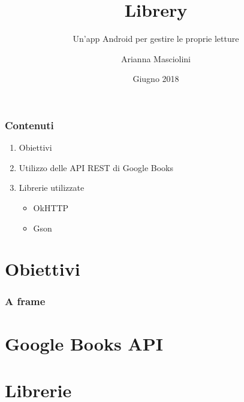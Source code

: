 \documentclass{beamer}
\title{Libre\textcolor{ProgBarBGColor}{ry}}
\subtitle{Un'app Android per gestire le proprie letture}
\author{Arianna Masciolini}
\institute{Università degli Studi di Perugia}
\date{Giugno 2018}
\begin{document}
	\setcounter{showProgressBar}{0}
	\setcounter{showSlideNumbers}{0}
	\frame{\titlepage}
	\begin{frame}
		\frametitle{Contenuti}
		\begin{enumerate}
			\item Obiettivi
			\item Utilizzo delle API REST di Google Books
			\item Librerie utilizzate
			\begin{itemize}
				\item OkHTTP
				\item Gson
			\end{itemize}
		\end{enumerate}
	\end{frame}
	\setcounter{framenumber}{0}
	\setcounter{showProgressBar}{1}
	\setcounter{showSlideNumbers}{1}
	\section{Obiettivi}
	\begin{frame}
		\frametitle{A frame}
	\end{frame}
\section{Google Books API}
\section{Librerie}
\end{document}
